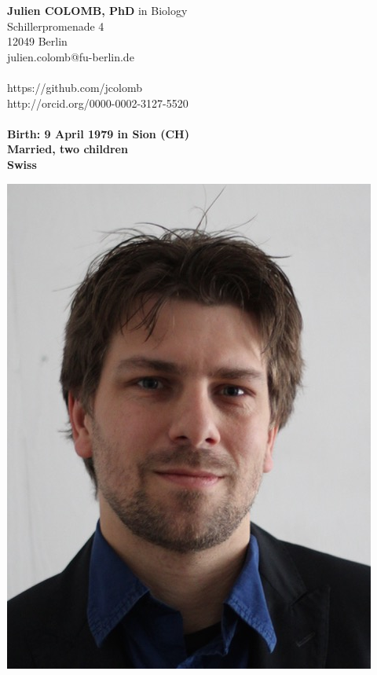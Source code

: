 \begin{minipage}[t]{\textwidth}
    \begin{minipage}[b]{0.5\textwidth}
        \textbf{Julien COLOMB, PhD} in Biology\\
        Schillerpromenade 4\\
        12049 Berlin\\
        julien.colomb@fu-berlin.de\\
         \\
        https://github.com/jcolomb\\
         http://orcid.org/0000-0002-3127-5520\\
         \\
   
        \textbf{Birth: 9 April 1979 in Sion (CH)}\\
        \textbf{Married, two children}\\
        \textbf{Swiss}
         
    \end{minipage}\hfill
    \begin{minipage}[b]{0.5\textwidth}
        \begin{flushright}
            \includegraphics[scale=0.3] {Figures/photo_CV.jpg}
        \end{flushright}
    \end{minipage}
\end{minipage}\\

